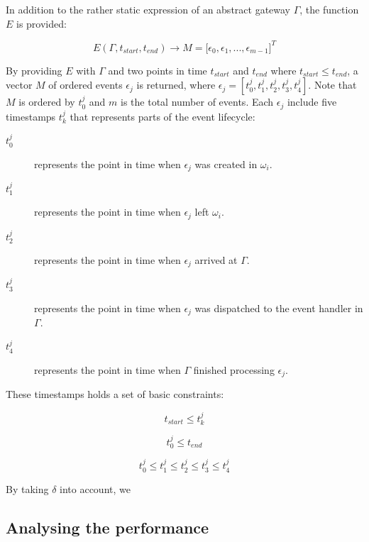 In addition to the rather static expression of an abstract gateway $\Gamma$,
the function $E$ is provided:

\begin{equation}
E(\Gamma, t_{start}, t_{end}) \to M = \big[ \epsilon_0, \epsilon_1, ...,
\epsilon_{m-1} \big]^T
\end{equation}

By providing $E$ with $\Gamma$ and two points in time $t_{start}$ and $t_{end}$
where $t_{start} \leq t_{end}$, a vector $M$ of ordered events $\epsilon_j$ is
returned, where $\epsilon_j = [ t_0^j, t_1^j, t_2^j, t_3^j, t_4^j ]$. Note that
$M$ is ordered by $t_0^j$ and $m$ is the total number of events. Each
$\epsilon_j$ include five timestamps $t_k^j$ that represents parts of the event
lifecycle:

\begin{description}
\item[$t_0^j$] represents the point in time when $\epsilon_j$ was created in
    $\omega_i$.
\item[$t_1^j$] represents the point in time when $\epsilon_j$ left $\omega_i$.
\item[$t_2^j$] represents the point in time when $\epsilon_j$ arrived at
    $\Gamma$.
\item[$t_3^j$] represents the point in time when $\epsilon_j$ was dispatched to
    the event handler in $\Gamma$.
\item[$t_4^j$] represents the point in time when $\Gamma$ finished processing
    $\epsilon_j$.
\end{description}

These timestamps holds a set of basic constraints:

\begin{equation}
t_{start} \leq t_k^j
\end{equation}

\begin{equation}
t_0^j \leq t_{end}
\end{equation}

\begin{equation}
t_0^j \leq t_1^j \leq t_2^j \leq t_3^j \leq t_4^j
\end{equation}

By taking $\delta$ into account, we


\subsection{Analysing the performance}

